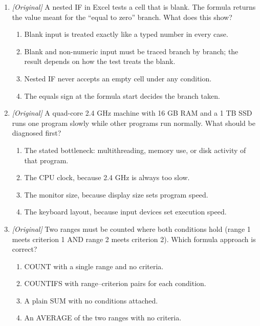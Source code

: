 \documentclass[11pt]{article}
\begin{document}
\begin{enumerate}[label=\textbf{Q\arabic*.}, leftmargin=*]
\begin{enumerate}[label=\Alph*.]
    \item Both (A) and (R) are true, but (R) is not the explanation of (A).
    \item (A) is true, but (R) is false.
    \item (A) is false, but (R) is true.
  \end{enumerate}
\item \textit{[Original]} A nested IF in Excel tests a cell that is blank.
  The formula returns the value meant for the ``equal to zero'' branch.
  What does this show?
  \begin{enumerate}[label=\Alph*.]
    \item Blank input is treated exactly like a typed number in every case.
    \item Blank and non-numeric input must be traced branch by branch; the
      result depends on how the test treats the blank.
    \item Nested IF never accepts an empty cell under any condition.
    \item The equals sign at the formula start decides the branch taken.
  \end{enumerate}
\item \textit{[Original]} A quad-core 2.4 GHz machine with 16 GB RAM and a
  1 TB SSD runs one program slowly while other programs run normally. What
  should be diagnosed first?
  \begin{enumerate}[label=\Alph*.]
    \item The stated bottleneck: multithreading, memory use, or disk
      activity of that program.
    \item The CPU clock, because 2.4 GHz is always too slow.
    \item The monitor size, because display size sets program speed.
    \item The keyboard layout, because input devices set execution speed.
  \end{enumerate}
\item \textit{[Original]} Two ranges must be counted where both conditions
  hold (range 1 meets criterion 1 AND range 2 meets criterion 2). Which
  formula approach is correct?
  \begin{enumerate}[label=\Alph*.]
    \item COUNT with a single range and no criteria.
    \item COUNTIFS with range--criterion pairs for each condition.
    \item A plain SUM with no conditions attached.
    \item An AVERAGE of the two ranges with no criteria.
  \end{enumerate}


\end{enumerate}
\end{document}
